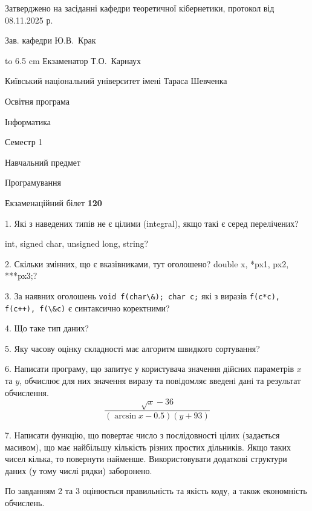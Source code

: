 \documentclass[12pt, ukrainian]{article}
\def\code#1{\Verb!#1!}
\begin{document}
{\smallskip\smallskip \begin {scriptsize} Затверджено на засіданні кафедри теоретичної кібернетики, протокол   від   08.11.2025 р.\par\smallskip\smallskip\smallskip\smallskip
{\parbox {6.5 cm} {Зав. кафедри \dotfill Ю.В.~Крак}}\hspace {0.7cm} {\hbox to 6.5 cm { Екзаменатор \dotfill Т.О.~Карнаух}} \end{scriptsize}}
\vspace{0.9cm}
{{\begin {scriptsize}\par
{ \center  Київський національний університет імені Тараса Шевченка \par}
{\parbox {5 cm}{Освітня програма \hfill}{\parbox {7 cm}{Інформатика\hfill}}\parbox {6 cm}{\hfill Семестр 1}}\par
{\parbox {5 cm} {Навчальний предмет \hfill}\parbox {7 cm}{Програмування \hfill}\parbox {6cm}{\hfill}\par}\vspace{-15pt} \end{scriptsize}}{\center Екзаменаційний білет \No \textbf { 120 }\par}}
{%
1. Які з наведених типів не є цілими (integral), якщо такі є серед перелічених?

int, signed char, unsigned long, string?
\par
\vspace{2mm}
2. Скільки змінних, що є вказівниками, тут оголошено?
double x, *px1, px2, ***px3;?
\par
\vspace{2mm}
3. За наявних оголошень \code{void f(char\&); char c;} які з виразів \code{f(c*c), f(c++), f(\&c)} є синтаксично коректними?
\par
\vspace{2mm}
4. Що таке тип даних?
\par
\vspace{2mm}
5. Яку часову оцінку складності має алгоритм швидкого сортування?
\par
\vspace{2mm}
6. Написати програму, що запитує у користувача значення дійсних параметрів $x$ та $y$, обчислює для них значення виразу та повiдомляє введенi данi та результат обчислення.
$$\frac{\sqrt x - 36}{(\arcsin x - 0.5) (y + 93)}$$ 

\par
7. Написати функцію, що повертає число з послідовності цілих (задається масивом), що має найбільшу кількість різних простих дільників. Якщо таких чисел кілька, то повернути найменше. Використовувати додаткові структури даних (у тому числі рядки) заборонено.

По завданням 2 та 3 оцінюється правильність та якість коду, а також економність обчислень.

}
\end{document}
